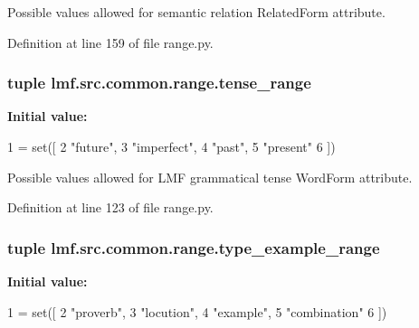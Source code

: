 Possible values allowed for semantic relation Related\+Form attribute. 



Definition at line 159 of file range.\+py.

\hypertarget{namespacelmf_1_1src_1_1common_1_1range_acc04186fd80669c626821ad13dcb1196}{
\subsubsection[{tense\+\_\+range}]{\setlength{\rightskip}{0pt plus 5cm}tuple lmf.\+src.\+common.\+range.\+tense\+\_\+range}}\label{namespacelmf_1_1src_1_1common_1_1range_acc04186fd80669c626821ad13dcb1196}
{\bfseries Initial value\+:}
\begin{DoxyCode}
1 = set([
2     \textcolor{stringliteral}{"future"},
3     \textcolor{stringliteral}{"imperfect"},
4     \textcolor{stringliteral}{"past"},
5     \textcolor{stringliteral}{"present"}
6 ])
\end{DoxyCode}


Possible values allowed for L\+M\+F grammatical tense Word\+Form attribute. 



Definition at line 123 of file range.\+py.

\hypertarget{namespacelmf_1_1src_1_1common_1_1range_ac02d347b39dab64b3ce3604168d1b652}{
\subsubsection[{type\+\_\+example\+\_\+range}]{\setlength{\rightskip}{0pt plus 5cm}tuple lmf.\+src.\+common.\+range.\+type\+\_\+example\+\_\+range}}\label{namespacelmf_1_1src_1_1common_1_1range_ac02d347b39dab64b3ce3604168d1b652}
{\bfseries Initial value\+:}
\begin{DoxyCode}
1 = set([
2     \textcolor{stringliteral}{"proverb"},
3     \textcolor{stringliteral}{"locution"},
4     \textcolor{stringliteral}{"example"},
5     \textcolor{stringliteral}{"combination"}
6 ])
\end{DoxyCode}


